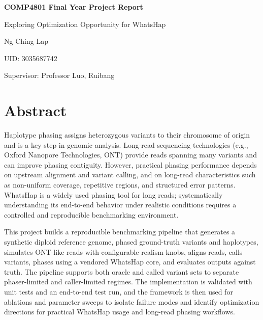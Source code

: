\documentclass[
]{article}
\author{}
\date{}
\begin{document}
\begin{titlepage}
\centering
\vspace*{\fill}

{\Huge \textbf{COMP4801 Final Year Project Report}\par}
\vspace{1cm}
{\LARGE Exploring Optimization Opportunity for WhatsHap\par}

\vspace{2cm}

{\large
Ng Ching Lap\par
UID: 3035687742\par
Supervisor: Professor Luo, Ruibang\par
}

\vspace*{\fill}
\end{titlepage}

\setcounter{page}{1}
\tableofcontents
\clearpage

\section{Abstract}\label{abstract}

Haplotype phasing assigns heterozygous variants to their chromosome of
origin and is a key step in genomic analysis. Long-read sequencing
technologies (e.g., Oxford Nanopore Technologies, ONT) provide reads
spanning many variants and can improve phasing contiguity. However,
practical phasing performance depends on upstream alignment and variant
calling, and on long-read characteristics such as non-uniform coverage,
repetitive regions, and structured error patterns. WhatsHap is a widely
used phasing tool for long reads; systematically understanding its
end-to-end behavior under realistic conditions requires a controlled and
reproducible benchmarking environment.

This project builds a reproducible benchmarking pipeline that generates
a synthetic diploid reference genome, phased ground-truth variants and
haplotypes, simulates ONT-like reads with configurable realism knobs,
aligns reads, calls variants, phases using a vendored WhatsHap core, and
evaluates outputs against truth. The pipeline supports both oracle and
called variant sets to separate phaser-limited and caller-limited
regimes. The implementation is validated with unit tests and an
end-to-end test run, and the framework is then used for ablations and
parameter sweeps to isolate failure modes and identify optimization
directions for practical WhatsHap usage and long-read phasing workflows.
\end{document}
